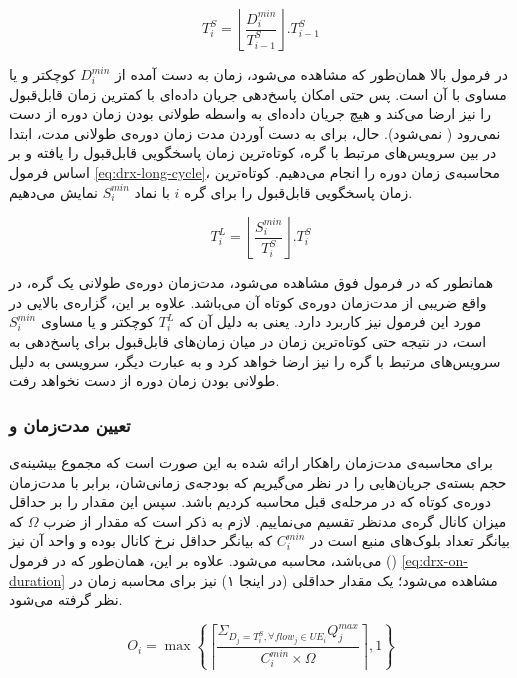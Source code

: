 \begin{equation}
T^S_i = \left\lfloor \frac{D^{min}_i}{T^S_{i-1}} \right\rfloor . T^S_{i-1}
\label{eq:drx-short-cycle}
\end{equation}

در فرمول بالا همان‌طور که مشاهده می‌شود، زمان به دست آمده از $D^{min}_i$ کوچکتر و یا مساوی با آن است. پس حتی امکان پاسخ‌دهی جریان داده‌ای با کمترین زمان قابل‌قبول را نیز ارضا می‌کند و هیچ جریان داده‌ای به واسطه طولانی بودن زمان دوره از دست نمی‌رود ( نمی‌شود). حال، برای به دست آوردن مدت زمان دوره‌ی طولانی مدت، ابتدا در بین سرویس‌های مرتبط با گره، کوتاه‌ترین زمان پاسخگویی قابل‌قبول را یافته و بر اساس فرمول \ref{eq:drx-long-cycle}، محاسبه‌ی زمان دوره را انجام می‌دهیم. کوتاه‌ترین زمان پاسخگویی قابل‌قبول را برای گره $i$ با نماد $S^{min}_i$ نمایش می‌دهیم.

\begin{equation}
T^L_i = \left\lfloor \frac{S^{min}_i}{T^S_i} \right\rfloor . T^S_i
\label{eq:drx-long-cycle}
\end{equation}

همانطور که در فرمول فوق مشاهده می‌شود، مدت‌زمان دوره‌ی طولانی یک گره، در واقع ضریبی از مدت‌زمان دوره‌ی کوتاه آن می‌باشد. علاوه بر این، گزاره‌ی بالایی در مورد این فرمول نیز کاربرد دارد. یعنی به دلیل آن که $T^L_i$ کوچکتر و یا مساوی $S^{min}_i$ است، در نتیجه حتی کوتاه‌ترین زمان در میان زمان‌های قابل‌قبول برای پاسخ‌دهی به سرویس‌های مرتبط با گره را نیز ارضا خواهد کرد و به عبارت دیگر، سرویسی به دلیل طولانی بودن زمان دوره از دست نخواهد رفت.

\subsubsection{تعیین مدت‌زمان  و }
برای محاسبه‌ی مدت‌زمان  راهکار ارائه شده به این صورت است که مجموع بیشینه‌ی حجم بسته‌ی جریان‌هایی را در نظر می‌گیریم که بودجه‌ی زمانی‌شان، برابر با مدت‌زمان دوره‌ی کوتاه که در مرحله‌ی قبل محاسبه کردیم باشد. سپس این مقدار را بر حداقل میزان کانال گره‌ی مدنظر تقسیم می‌نماییم. لازم به ذکر است که مقدار از ضرب $\Omega$ که بیانگر تعداد بلوک‌های منبع است در $C^{min}_i$ که بیانگر حداقل نرخ کانال بوده و واحد آن نیز () می‌باشد، محاسبه می‌شود. علاوه بر این، همان‌طور که در فرمول \ref{eq:drx-on-duration} مشاهده می‌شود؛ یک مقدار حداقلی (در اینجا ۱) نیز برای محاسبه زمان  در نظر گرفته می‌شود.

\begin{equation}
O_i = \max \left\{ \left\lceil \frac{\Sigma_{D_j = T^S_i, \forall flow_j \in U E_i} Q^{max}_j}{C^{min}_i \times \Omega} \right\rceil , 1 \right\}
\label{eq:drx-on-duration}
\end{equation}

